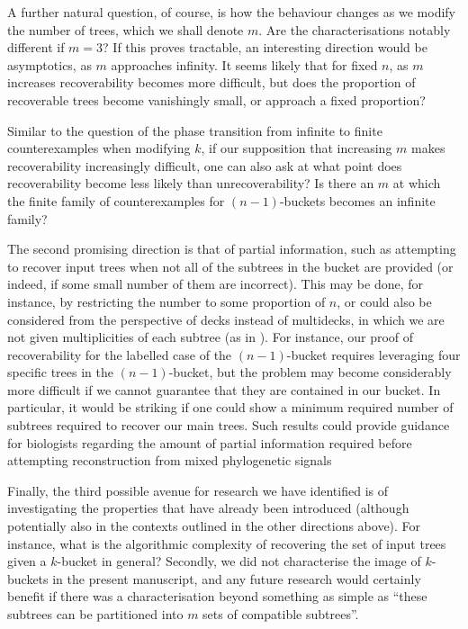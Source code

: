 \documentclass[12pt]{article}
\theoremstyle{definition}
\begin{document}
A further natural question, of course, is how the behaviour changes as we modify the number of trees, which we shall denote $m$. Are the characterisations notably different if $m=3$? If this proves tractable, an interesting direction would be asymptotics, as $m$ approaches infinity. It seems likely that for fixed $n$, as $m$ increases recoverability becomes more difficult, but does the proportion of recoverable trees become vanishingly small, or approach a fixed proportion? 

Similar to the question of the phase transition from infinite to finite counterexamples when modifying $k$, if our supposition that increasing $m$ makes recoverability increasingly difficult, one can also ask at what point does recoverability become less likely than unrecoverability? Is there an $m$ at which the finite family of counterexamples for $(n-1)$-buckets becomes an infinite family?

The second promising direction is that of partial information, such as attempting to recover input trees when not all of the subtrees in the bucket are provided (or indeed, if some small number of them are incorrect). This may be done, for instance, by restricting the number to some proportion of $n$, or could also be considered from the perspective of decks instead of multidecks, in which we are not given multiplicities of each subtree (as in \cite{Decks_of_rooted_binary_trees}). For instance, our proof of recoverability for the labelled case of the $(n-1)$-bucket requires leveraging four specific trees in the $(n-1)$-bucket, but the problem may become considerably more difficult if we cannot guarantee that they are contained in our bucket. In particular, it would be striking if one could show a minimum required number of subtrees required to recover our main trees. Such results could provide guidance for biologists regarding the amount of partial information required before attempting reconstruction from mixed phylogenetic signals

Finally, the third possible avenue for research we have identified is of investigating the properties that have already been introduced (although potentially also in the contexts outlined in the other directions above). For instance, what is the algorithmic complexity of recovering the set of input trees given a $k$-bucket in general? Secondly, we did not characterise the image of $k$-buckets in the present manuscript, and any future research would certainly benefit if there was a characterisation beyond something as simple as ``these subtrees can be partitioned into $m$ sets of compatible subtrees''.
\end{document}
